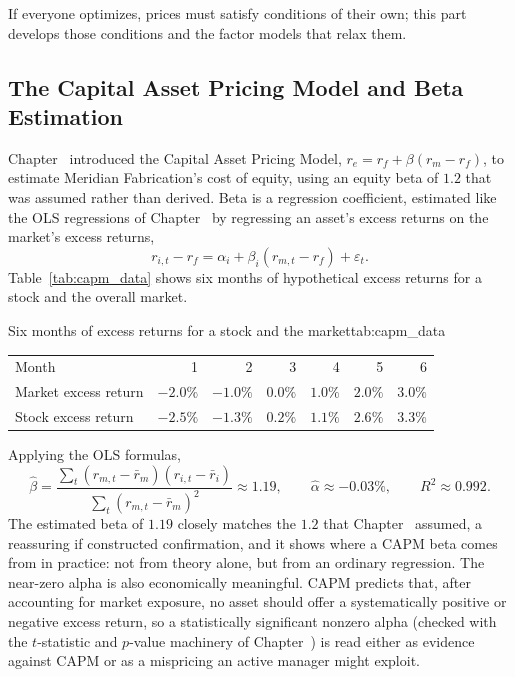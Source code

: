 \documentclass[../ai_in_finance]{subfiles}
\begin{document}
If everyone optimizes, prices must satisfy conditions of their own; this part develops those conditions and the factor models that relax them.

\subsection{The Capital Asset Pricing Model and Beta Estimation}
\label{sec:capm-beta}

Chapter~ introduced the Capital Asset Pricing Model, $r_e = r_f + \beta(r_m - r_f)$, to estimate Meridian Fabrication's cost of equity, using an equity beta of $1.2$ that was assumed rather than derived. Beta is a regression coefficient, estimated like the OLS regressions of Chapter~ by regressing an asset's excess returns on the market's excess returns,
\begin{equation}
r_{i,t} - r_f = \alpha_i + \beta_i (r_{m,t} - r_f) + \varepsilon_t.
\label{eq:portfolio-capm}
\end{equation}
Table~\ref{tab:capm_data} shows six months of hypothetical excess returns for a stock and the overall market.

\begin{booktable}[htbp]{Six months of excess returns for a stock and the market}{tab:capm_data}
\begin{tabular}{lrrrrrr}
\toprule
Month & 1 & 2 & 3 & 4 & 5 & 6 \\
Market excess return & $-2.0\%$ & $-1.0\%$ & $0.0\%$ & $1.0\%$ & $2.0\%$ & $3.0\%$ \\
Stock excess return & $-2.5\%$ & $-1.3\%$ & $0.2\%$ & $1.1\%$ & $2.6\%$ & $3.3\%$ \\
\bottomrule
\end{tabular}
\end{booktable}

Applying the OLS formulas,
\begin{equation*}
\hat\beta = \frac{\sum_t (r_{m,t}-\bar r_m)(r_{i,t}-\bar r_i)}{\sum_t (r_{m,t}-\bar r_m)^2} \approx 1.19, \qquad \hat\alpha \approx -0.03\%, \qquad R^2 \approx 0.992.
\end{equation*}
The estimated beta of $1.19$ closely matches the $1.2$ that Chapter~ assumed, a reassuring if constructed confirmation, and it shows where a CAPM beta comes from in practice: not from theory alone, but from an ordinary regression.
The near-zero alpha is also economically meaningful. CAPM predicts that, after accounting for market exposure, no asset should offer a systematically positive or negative excess return, so a statistically significant nonzero alpha (checked with the $t$-statistic and $p$-value machinery of Chapter~) is read either as evidence against CAPM or as a mispricing an active manager might exploit.
\end{document}
